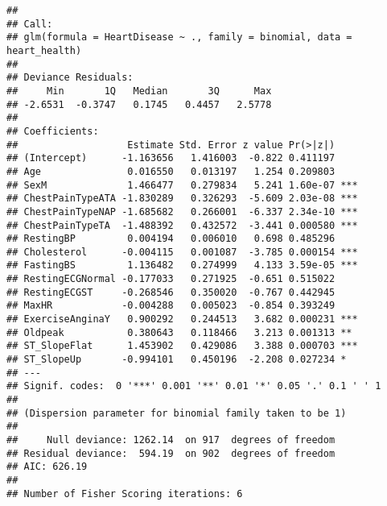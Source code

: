 \documentclass[
]{article}
\begin{document}
\begin{verbatim}
## 
## Call:
## glm(formula = HeartDisease ~ ., family = binomial, data = heart_health)
## 
## Deviance Residuals: 
##     Min       1Q   Median       3Q      Max  
## -2.6531  -0.3747   0.1745   0.4457   2.5778  
## 
## Coefficients:
##                   Estimate Std. Error z value Pr(>|z|)    
## (Intercept)      -1.163656   1.416003  -0.822 0.411197    
## Age               0.016550   0.013197   1.254 0.209803    
## SexM              1.466477   0.279834   5.241 1.60e-07 ***
## ChestPainTypeATA -1.830289   0.326293  -5.609 2.03e-08 ***
## ChestPainTypeNAP -1.685682   0.266001  -6.337 2.34e-10 ***
## ChestPainTypeTA  -1.488392   0.432572  -3.441 0.000580 ***
## RestingBP         0.004194   0.006010   0.698 0.485296    
## Cholesterol      -0.004115   0.001087  -3.785 0.000154 ***
## FastingBS         1.136482   0.274999   4.133 3.59e-05 ***
## RestingECGNormal -0.177033   0.271925  -0.651 0.515022    
## RestingECGST     -0.268546   0.350020  -0.767 0.442945    
## MaxHR            -0.004288   0.005023  -0.854 0.393249    
## ExerciseAnginaY   0.900292   0.244513   3.682 0.000231 ***
## Oldpeak           0.380643   0.118466   3.213 0.001313 ** 
## ST_SlopeFlat      1.453902   0.429086   3.388 0.000703 ***
## ST_SlopeUp       -0.994101   0.450196  -2.208 0.027234 *  
## ---
## Signif. codes:  0 '***' 0.001 '**' 0.01 '*' 0.05 '.' 0.1 ' ' 1
## 
## (Dispersion parameter for binomial family taken to be 1)
## 
##     Null deviance: 1262.14  on 917  degrees of freedom
## Residual deviance:  594.19  on 902  degrees of freedom
## AIC: 626.19
## 
## Number of Fisher Scoring iterations: 6
\end{verbatim}
\end{document}

